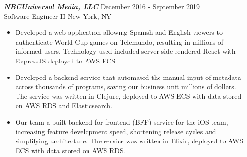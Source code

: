 {\sl \textbf{NBCUniversal Media, LLC}} \hfill December 2016 - September 2019 \\ Software Engineer II \hfill New York, NY
\begin{itemize}
    \item Developed a web application allowing Spanish and English viewers to authenticate World Cup games on Telemundo, resulting in millions of informed users. Technology used included server-side rendered React with ExpressJS deployed to AWS ECS.
    \item Developed a backend service that automated the manual input of metadata across thousands of programs, saving our business unit millions of dollars. The service was written in Clojure, deployed to AWS ECS with data stored on AWS RDS and Elasticsearch.
    \item Our team a built backend-for-frontend (BFF) service for the iOS team, increasing feature development speed, shortening release cycles and simplifying architecture. The service was written in Elixir, deployed to AWS ECS with data stored on AWS RDS.
\end{itemize}
